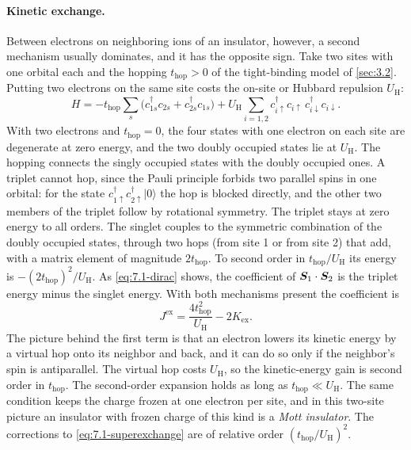 \paragraph{Kinetic exchange.} Between electrons on neighboring ions of an insulator, however, a second mechanism usually dominates, and it has the opposite sign. Take two sites with one orbital each and the hopping $t_{\mathrm{hop}} > 0$ of the tight-binding model of \cref{sec:3.2}. Putting two electrons on the same site costs the on-site or Hubbard repulsion $U_{\mathrm{H}}$:
\begin{equation}
  H = -t_{\mathrm{hop}}\sum_{s}\bigl(c^\dagger_{1s}c_{2s} + c^\dagger_{2s}c_{1s}\bigr) + U_{\mathrm{H}}\sum_{i=1,2}c^\dagger_{i\uparrow}c_{i\uparrow}\,c^\dagger_{i\downarrow}c_{i\downarrow} .
  \label{eq:7.1-hubbard}
\end{equation}
With two electrons and $t_{\mathrm{hop}} = 0$, the four states with one electron on each site are degenerate at zero energy, and the two doubly occupied states lie at $U_{\mathrm{H}}$. The hopping connects the singly occupied states with the doubly occupied ones. A triplet cannot hop, since the Pauli principle forbids two parallel spins in one orbital: for the state $c^\dagger_{1\uparrow}c^\dagger_{2\uparrow}|0\rangle$ the hop is blocked directly, and the other two members of the triplet follow by rotational symmetry. The triplet stays at zero energy to all orders. The singlet couples to the symmetric combination of the doubly occupied states, through two hops (from site 1 or from site 2) that add, with a matrix element of magnitude $2t_{\mathrm{hop}}$. To second order in $t_{\mathrm{hop}}/U_{\mathrm{H}}$ its energy is $-(2t_{\mathrm{hop}})^2/U_{\mathrm{H}}$. As \cref{eq:7.1-dirac} shows, the coefficient of $\bm{S}_1\cdot\bm{S}_2$ is the triplet energy minus the singlet energy. With both mechanisms present the coefficient is
\begin{equation}
  J^{\mathrm{ex}} = \frac{4t_{\mathrm{hop}}^2}{U_{\mathrm{H}}} - 2K_{\mathrm{ex}} .
  \label{eq:7.1-superexchange}
\end{equation}
The picture behind the first term is that an electron lowers its kinetic energy by a virtual hop onto its neighbor and back, and it can do so only if the neighbor's spin is antiparallel. The virtual hop costs $U_{\mathrm{H}}$, so the kinetic-energy gain is second order in $t_{\mathrm{hop}}$. The second-order expansion holds as long as $t_{\mathrm{hop}} \ll U_{\mathrm{H}}$. The same condition keeps the charge frozen at one electron per site, and in this two-site picture an insulator with frozen charge of this kind is a \emph{Mott insulator}. The corrections to \cref{eq:7.1-superexchange} are of relative order $(t_{\mathrm{hop}}/U_{\mathrm{H}})^2$.

